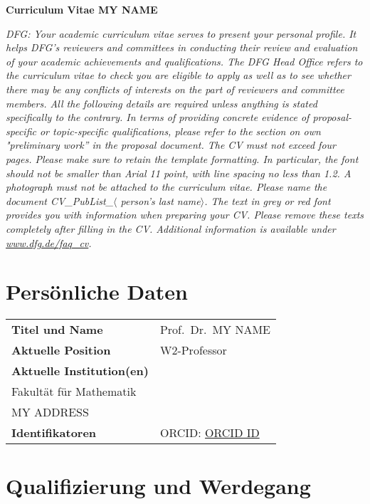 \documentclass[a4paper,11pt]{article}
\def\mytitle{Prof.\ Dr.\ }
\def\myname{MY NAME}
\def\myinstitute{\begin{minipage}[t]{8cm}
    MY UNIVERSITY\\
    Fakultät für Mathematik\\
    MY ADDRESS
    \end{minipage}\vspace{.3ex}}
\def\myORCID{\href{https://orcid.org/0000-0002-9271-8436}{ORCID ID}} %
\def\myidentifier{ORCID: \myORCID}
\def\myposition{W2-Professor}
\begin{document}

\thispagestyle{empty}

\mbox{}
\vspace{-9ex}

\centerline{\Large \bf Curriculum Vitae \myname}
\emph{DFG: Your academic curriculum vitae serves to present your personal profile. It helps DFG’s reviewers and committees in conducting their review and evaluation of your academic achievements and qualifications. The DFG Head Office refers to the curriculum vitae to check you are eligible to apply as well as to see whether there may be any conflicts of interests on the part of reviewers and committee members. All the following details are required unless anything is stated specifically to the contrary.
In terms of providing concrete evidence of proposal-specific or topic-specific qualifications, please refer to the section on own "preliminary work” in the proposal document.
The CV must not exceed four pages. Please make sure to retain the template formatting. In particular, the font should not be smaller than Arial 11 point, with line spacing no less than 1.2. A photograph must not be attached to the curriculum vitae. Please 
name the document CV\_PubList\_$\langle$ person’s last name$\rangle$.
The text in grey or red font provides you with information when preparing your CV. Please remove these texts completely after filling in the CV.
Additional information is available under \url{www.dfg.de/faq_cv}.}
\section*{Persönliche Daten}

\noindent
\begin{tabularx}{\textwidth}{@{}ll}
  \textbf{Titel und Name} & \mytitle \myname \\
  \textbf{Aktuelle Position} & \myposition \\
  \textbf{Aktuelle Institution(en)} & \myinstitute \\
  \textbf{Identifikatoren} & \myidentifier
\end{tabularx}


\section*{Qualifizierung und Werdegang}
\end{document}
